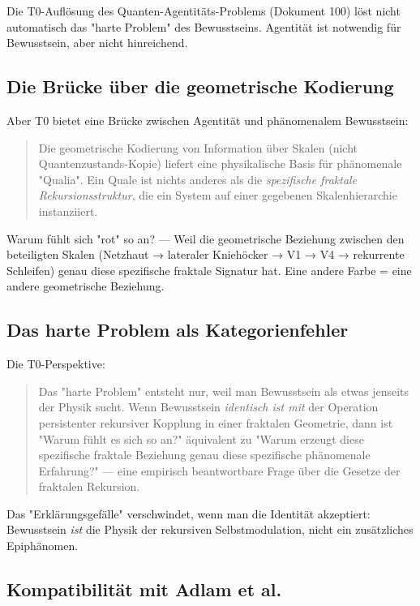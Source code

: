 \documentclass[11pt,a4paper]{article}
\begin{document}
	\begin{important}
		Die T0-Auflösung des Quanten-Agentitäts-Problems (Dokument 100) löst nicht automatisch das "harte Problem" des Bewusstseins. Agentität ist notwendig für Bewusstsein, aber nicht hinreichend.
	\end{important}
	
	\subsection{Die Brücke über die geometrische Kodierung}
	
	Aber T0 bietet eine Brücke zwischen Agentität und phänomenalem Bewusstsein:
	
	\begin{quote}
		Die geometrische Kodierung von Information über Skalen (nicht Quantenzustands-Kopie) liefert eine physikalische Basis für phänomenale "Qualia". Ein Quale ist nichts anderes als die \emph{spezifische fraktale Rekursionsstruktur}, die ein System auf einer gegebenen Skalenhierarchie instanziiert.
	\end{quote}
	
	Warum fühlt sich "rot" so an? — Weil die geometrische Beziehung zwischen den beteiligten Skalen (Netzhaut → lateraler Kniehöcker → V1 → V4 → rekurrente Schleifen) genau diese spezifische fraktale Signatur hat. Eine andere Farbe = eine andere geometrische Beziehung.
	
	\subsection{Das harte Problem als Kategorienfehler}
	
	Die T0-Perspektive:
	\begin{quote}
		Das "harte Problem" entsteht nur, weil man Bewusstsein als etwas jenseits der Physik sucht. Wenn Bewusstsein \emph{identisch ist mit} der Operation persistenter rekursiver Kopplung in einer fraktalen Geometrie, dann ist "Warum fühlt es sich so an?" äquivalent zu "Warum erzeugt diese spezifische fraktale Beziehung genau diese spezifische phänomenale Erfahrung?" — eine empirisch beantwortbare Frage über die Gesetze der fraktalen Rekursion.
	\end{quote}
	
	Das "Erklärungsgefälle" verschwindet, wenn man die Identität akzeptiert: Bewusstsein \emph{ist} die Physik der rekursiven Selbstmodulation, nicht ein zusätzliches Epiphänomen.
	
	\subsection{Kompatibilität mit Adlam et al.}
	
\end{document}
